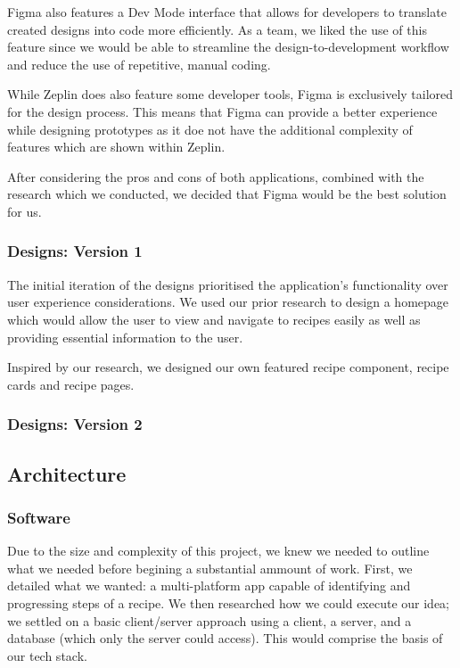 \documentclass{article}
\begin{document}
    Figma also features a Dev Mode interface that allows for developers to translate created designs into code more efficiently. As a team, we liked the use of this feature since we would be able to streamline the design-to-development workflow and reduce the use of repetitive, manual coding.
    
    While Zeplin does also feature some developer tools, Figma is exclusively tailored for the design process. This means that Figma can provide a better experience while designing prototypes as it doe not have the additional complexity of features which are shown within Zeplin. 

    After considering the pros and cons of both applications, combined with the research which we conducted, we decided that Figma would be the best solution for us.
    
    \subsubsection{Designs: Version 1}
    The initial iteration of the designs prioritised the application's functionality over user experience considerations. We used our prior research to design a homepage which would allow the user to view and navigate to recipes easily as well as providing essential information to the user. 

    Inspired by our research, we designed our own featured recipe component, recipe cards and recipe pages. 

    \subsubsection{Designs: Version 2}

    \subsection{Architecture}
    \subsubsection{Software}
    Due to the size and complexity of this project, we knew we needed to outline what we needed before begining a substantial ammount of work. First, we detailed what we wanted: a multi-platform app capable of identifying and progressing steps of a recipe. We then researched how we could execute our idea; we settled on a basic client/server approach using a client, a server, and a database (which only the server could access). This would comprise the basis of our tech stack.
\end{document}
